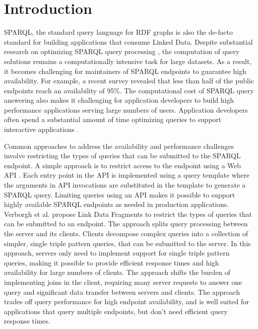 \section{Introduction}
SPARQL, the standard query language for RDF graphs is also the de-facto standard for building applications that consume Linked Data. 
Despite substantial research on optimizing SPARQL query processing \cite{Pham2013}, the computation of query solutions remains a computationally intensive task for large datasets.
As a result, it becomes challenging for maintainers of SPARQL endpoints to guarantee high availability.
For example, a recent survey \cite{buil2013sparql} revealed that less than half of the public endpoints reach an availability of 95\%.
The computational cost of SPARQL query answering also makes it challenging for application developers to build high performance applications serving large numbers of users.
Application developers often spend a substantial amount of time optimizing queries to support interactive applications \cite{Loizou_Angles_Groth_2014}.

Common approaches to address the availability and performance challenges involve restricting the types of queries that can be submitted to the SPARQL endpoint.
A simple approach is to restrict access to the endpoint using a Web API \cite{Groth_Loizou_Gray_Goble_Harland_Pettifer_2014}.
Each entry point in the API is implemented using a query template where the arguments in API invocations are substituted in the template to generate a SPARQL query.
Limiting queries using an API makes it possible to support highly available SPARQL endpoints as needed in production applications.
%
Verborgh et al. \cite{Verborgh2014} propose Link Data Fragments to restrict the types of queries that can be submitted to an endpoint. 
The approach splits query processing between the server and its clients.
Clients decompose complex queries into a collection of simpler, single triple pattern queries, that can be submitted to the server.
In this approach, servers only need to implement support for single triple pattern queries, making it possible to provide efficient response times and high availability for large numbers of clients.
The approach shifts the burden of implementing joins in the client, requiring many server requests to answer one query and significant data transfer between servers and clients. 
The approach trades off query performance for high endpoint availability, and is well suited for applications that query multiple endpoints, but don't need efficient query response times.

